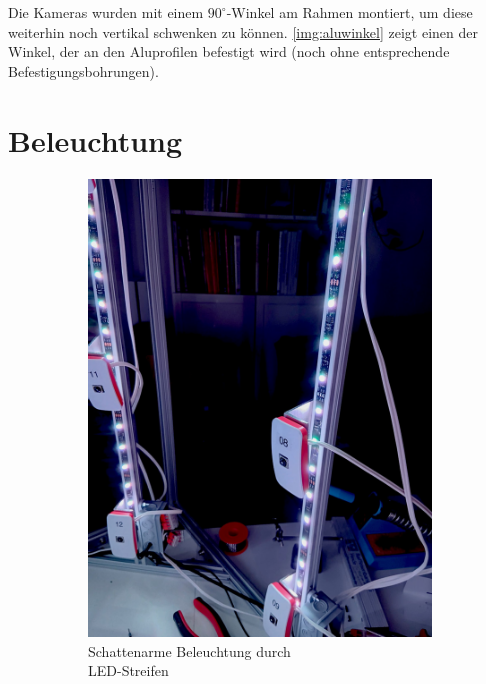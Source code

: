 \documentclass[./00PhotoBox.tex]{subfiles}
\begin{document}
Die Kameras wurden mit einem $90^\circ$-Winkel am Rahmen montiert, um diese weiterhin noch vertikal schwenken zu können. \autoref{img:aluwinkel} zeigt einen der Winkel, der an den Aluprofilen befestigt wird (noch ohne entsprechende Befestigungsbohrungen).


\section{Beleuchtung}

\begin{figure}
    \centering
    \begin{subfigure}{0.45\textwidth}
        \includegraphics[height=1.2\linewidth]{./img/3_aufbau/beleuchtung.jpg}
        \centering
        \caption{Schattenarme Beleuchtung durch \\LED-Streifen}
        \label{img:led_streifen}
    \end{subfigure}
    \begin{subfigure}{0.45\textwidth}

\end{subfigure}
\end{figure}
\end{document}
